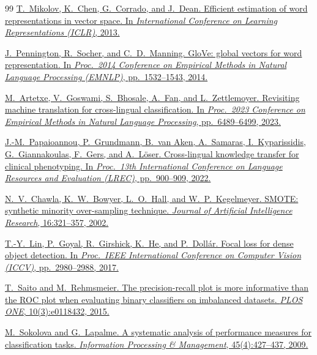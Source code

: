 \documentclass[11pt,a4paper]{article}
\begin{document}
\begin{thebibliography}{99}
\href{https://arxiv.org/abs/1301.3781}{%
T.~Mikolov, K.~Chen, G.~Corrado, and J.~Dean.
Efficient estimation of word representations in vector space.
In \textit{International Conference on Learning Representations (ICLR)}, 2013.}

\href{https://doi.org/10.3115/v1/D14-1162}{%
J.~Pennington, R.~Socher, and C.~D.~Manning.
GloVe: global vectors for word representation.
In \textit{Proc.\ 2014 Conference on Empirical Methods in Natural Language Processing (EMNLP)},
pp.~1532--1543, 2014.}

\href{https://aclanthology.org/2023.emnlp-main.399/}{%
M.~Artetxe, V.~Goswami, S.~Bhosale, A.~Fan, and L.~Zettlemoyer.
Revisiting machine translation for cross-lingual classification.
In \textit{Proc.\ 2023 Conference on Empirical Methods in Natural Language Processing},
pp.~6489--6499, 2023.}

\href{https://aclanthology.org/2022.lrec-1.95/}{%
J.-M.~Papaioannou, P.~Grundmann, B.~van Aken, A.~Samaras, I.~Kyparissidis,
G.~Giannakoulas, F.~Gers, and A.~L\"oser.
Cross-lingual knowledge transfer for clinical phenotyping.
In \textit{Proc.\ 13th International Conference on Language Resources and Evaluation (LREC)},
pp.~900--909, 2022.}

\href{https://doi.org/10.1613/jair.953}{%
N.~V.~Chawla, K.~W.~Bowyer, L.~O.~Hall, and W.~P.~Kegelmeyer.
SMOTE: synthetic minority over-sampling technique.
\textit{Journal of Artificial Intelligence Research}, 16:321--357, 2002.}

\href{https://doi.org/10.1109/ICCV.2017.324}{%
T.-Y.~Lin, P.~Goyal, R.~Girshick, K.~He, and P.~Doll\'{a}r.
Focal loss for dense object detection.
In \textit{Proc.\ IEEE International Conference on Computer Vision (ICCV)},
pp.~2980--2988, 2017.}

\href{https://doi.org/10.1371/journal.pone.0118432}{%
T.~Saito and M.~Rehmsmeier.
The precision-recall plot is more informative than the ROC plot when evaluating binary classifiers on imbalanced datasets.
\textit{PLOS ONE}, 10(3):e0118432, 2015.}

\href{https://doi.org/10.1016/j.ipm.2009.03.002}{%
M.~Sokolova and G.~Lapalme.
A systematic analysis of performance measures for classification tasks.
\textit{Information Processing \& Management}, 45(4):427--437, 2009.}

\end{thebibliography}
\end{document}
